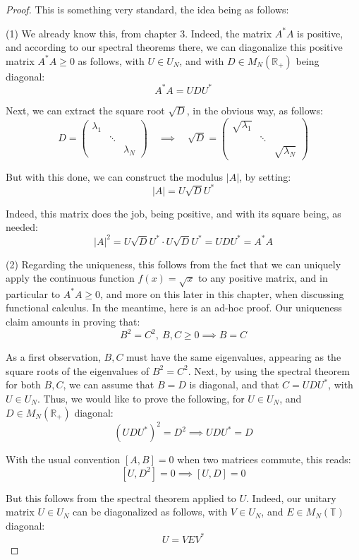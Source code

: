 \documentclass[12pt]{amsbook}
\begin{document}
\begin{proof}
This is something very standard, the idea being as follows:

\medskip

(1) We already know this, from chapter 3. Indeed, the matrix $A^*A$ is positive, and according to our spectral theorems there, we can diagonalize this positive matrix $A^*A\geq0$ as follows, with $U\in U_N$, and with $D\in M_N(\mathbb R_+)$ being diagonal:
$$A^*A=UDU^*$$

Next, we can extract the square root $\sqrt{D}$, in the obvious way, as follows:
$$D=\begin{pmatrix}
\lambda_1\\
&\ddots\\
&&\lambda_N
\end{pmatrix}\quad\implies\quad 
\sqrt{D}=\begin{pmatrix}
\sqrt{\lambda_1}\\
&\ddots\\
&&\sqrt{\lambda_N}
\end{pmatrix}$$
 
But with this done, we can construct the modulus $|A|$, by setting:
$$|A|=U\sqrt{D}U^*$$

Indeed, this matrix does the job, being positive, and with its square being, as needed:
$$|A|^2=U\sqrt{D}U^*\cdot U\sqrt{D}U^*=UDU^*=A^*A$$

(2) Regarding the uniqueness, this follows from the fact that we can uniquely apply the continuous function $f(x)=\sqrt{x}$ to any positive matrix, and in particular to $A^*A\geq0$, and more on this later in this chapter, when discussing functional calculus. In the meantime, here is an ad-hoc proof. Our uniqueness claim amounts in proving that:
$$B^2=C^2,\ B,C\geq0\implies B=C$$

As a first observation, $B,C$ must have the same eigenvalues, appearing as the square roots of the eigenvalues of $B^2=C^2$. Next, by using the spectral theorem for both $B,C$, we can assume that $B=D$ is diagonal, and that $C=UDU^*$, with $U\in U_N$. Thus, we would like to prove the following, for $U\in U_N$, and $D\in M_N(\mathbb R_+)$ diagonal:
$$(UDU^*)^2=D^2\implies UDU^*=D$$

With the usual convention $[A,B]=0$ when two matrices commute, this reads:
$$[U,D^2]=0\implies[U,D]=0$$

But this follows from the spectral theorem applied to $U$. Indeed, our unitary matrix $U\in U_N$ can be diagonalized as follows, with $V\in U_N$, and $E\in M_N(\mathbb T)$ diagonal:
$$U=VEV^*$$


\end{proof}
\end{document}

